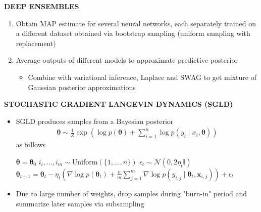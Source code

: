 \begin{whitebox}{\textbf{DEEP ENSEMBLES}}
    \begin{enumerate}
        \item Obtain MAP estimate for several neural networks, each separately trained on a different dataset obtained via bootstrap sampling (uniform sampling with replacement)
        \item Average outputs of different models to approximate predictive posterior
        \begin{itemize}
            \item Combine with variational inference, Laplace and SWAG to get mixture of Gaussian posterior approximations
        \end{itemize}
    \end{enumerate}
\end{whitebox}

\begin{whitebox}{\textbf{STOCHASTIC GRADIENT LANGEVIN DYNAMICS (SGLD)}}
    \begin{itemize}
        \item SGLD produces samples from a Bayesian posterior
        \begin{align*}
            \bm{\theta}\sim\frac{1}{Z}\exp\left(\log p(\bm{\theta})+\sum_{i=1}^n\log p(y_i\mid x_i,\bm{\theta})\right)
        \end{align*}
        as follows
        \begin{center}
            \begin{algorithmic}
                \footnotesize
                \State $\bm{\theta}=\bm{\theta}_0$
                \State $i_i,\dots,i_m\sim\mathrm{Uniform}(\{1,\dots,n\})$
                \State $\epsilon_t\sim\mathcal{N}(0,2\eta_t\mathbb{I})$
                \State $\bm{\theta}_{t+1}=\bm{\theta}_t-\eta_t\left(\nabla\log p(\bm{\theta}_t)+\frac{n}{m}\sum_{j=1}^m\nabla\log p(y_{i,j}\mid\bm{\theta}_t,\bm{x}_{i,j})\right)+\epsilon_t$
                \EndFor
            \end{algorithmic}
        \end{center}
        \item Due to large number of weights, drop samples during "burn-in" period and summarize later samples via subsampling
    \end{itemize}
\end{whitebox}

